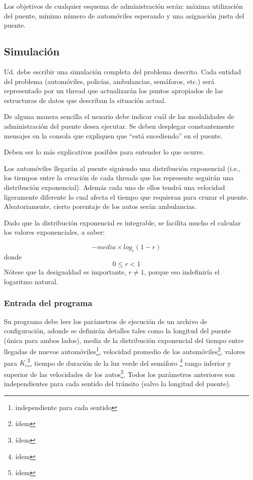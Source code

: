 \documentclass[11pt]{article}
\begin{document}
Los objetivos de cualquier esquema de administración serán: máxima utilización del puente, mínimo número de automóviles esperando y una asignación justa del puente.


\subsection{Simulación}
Ud. debe escribir una simulación completa del problema descrito. Cada entidad del problema (automóviles, policías, ambulancias, semáforos, etc.) será representado por un thread que actualizarán los puntos apropiados de las estructuras de datos que describan la situación actual.

De alguna manera sencilla el usuario debe indicar cuál de las modalidades de administración del puente desea ejecutar. Se deben desplegar constantemente mensajes en la consola que expliquen que ``está sucediendo'' en el puente.

Deben ser lo más explicativos posibles para entender lo que ocurre.

Los automóviles llegarán al puente siguiendo una distribución exponencial (i.e., los tiempos entre la creación de cada threads que los represente seguirán una distribución exponencial). Además cada uno de ellos tendrá una velocidad ligeramente diferente lo cual afecta el tiempo que requieran para cruzar el puente. Aleatoriamente, cierto porentaje de los autos serán ambulancias.

Dado que la distribución exponencial es integrable, se facilita mucho el calcular los valores exponenciales, a saber:

$$ -media\times log_e(1-r) $$ donde $$0\leq r < 1$$ Nótese que la desigualdad es importante, $r \not = 1$, porque eso indefiniría el logaritmo natural.

\subsubsection{Entrada del programa}

Su programa debe leer los parámetros de ejecución de un archivo de configuración, adonde se definirán detalles tales como la longitud del puente (única para ambos lados), media de la distribución exponencial del tiempo entre llegadas de nuevos automóviles\footnote{independiente para cada sentido}, velocidad promedio de los automóviles\footnote{ídem}, valores para $K_i$\footnote{ídem}, tiempo de duración de la luz verde del semáforo \footnote{ídem} rango inferior y superior de las velocidades de los autos\footnote{ídem}. Todos los parámetros anteriores son independientes para cada sentido del tránsito (salvo la longitud del puente).
\end{document}
